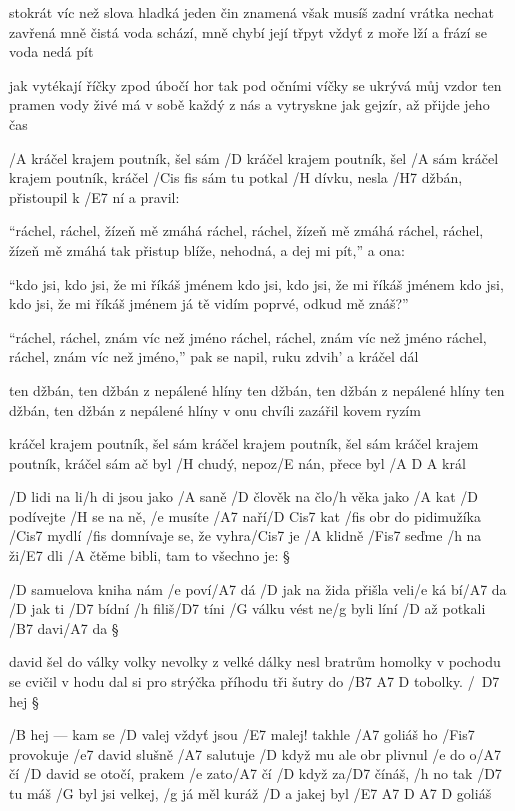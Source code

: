 stokrát víc než slova hladká jeden čin znamená
však musíš zadní vrátka nechat zavřená
mně čistá voda schází, mně chybí její třpyt
vždyť z moře lží a frází se voda nedá pít \s

jak vytékají říčky zpod úbočí hor
tak pod očními víčky se ukrývá můj vzdor
ten pramen vody živé má v sobě každý z nás
a vytryskne jak gejzír, až přijde jeho čas




/A kráčel krajem poutník, šel sám
/D kráčel krajem poutník, šel /A sám
kráčel krajem poutník, kráčel /{Cis fis} sám
tu potkal /H dívku, nesla /H7 džbán, přistoupil k /E7 ní a pravil: \s

``ráchel, ráchel, žízeň mě zmáhá
ráchel, ráchel, žízeň mě zmáhá
ráchel, ráchel, žízeň mě zmáhá
tak přistup blíže, nehodná, a dej mi pít,'' a ona: \s

``kdo jsi, kdo jsi, že mi říkáš jménem
kdo jsi, kdo jsi, že mi říkáš jménem
kdo jsi, kdo jsi, že mi říkáš jménem
já tě vidím poprvé, odkud mě znáš?'' \s

``ráchel, ráchel, znám víc než jméno
ráchel, ráchel, znám víc než jméno
ráchel, ráchel, znám víc než jméno,''
pak se napil, ruku zdvih' a kráčel dál \s

ten džbán, ten džbán z nepálené hlíny
ten džbán, ten džbán z nepálené hlíny
ten džbán, ten džbán z nepálené hlíny
v onu chvíli zazářil kovem ryzím \s

kráčel krajem poutník, šel sám
kráčel krajem poutník, šel sám
kráčel krajem poutník, kráčel sám
ač byl /H chudý, nepoz/E nán, přece byl /{A D A} král




/D lidi na li/h di jsou jako /A saně
/D člověk na člo/h věka jako /A kat
/D podívejte /H se na ně, /e musíte /A7 naří/{D Cis7} kat
/fis obr do pidimužíka /Cis7 mydlí
/fis domnívaje se, že vyhra/Cis7 je
/A klidně /Fis7 seďme /h na ži/E7 dli
/A čtěme bibli, tam to všechno je: \S

/D samuelova kniha nám /e poví/A7 dá
/D jak na žida přišla veli/e ká bí/A7 da
/D jak ti /D7 bídní /h filiš/D7 tíni %
/G válku vést ne/g byli líní
/D až potkali /B7 davi/A7 da \S

david šel do války volky nevolky
z velké dálky nesl bratrům homolky
v pochodu se cvičil v hodu %
dal si pro strýčka příhodu
tři šutry do /{B7 A7 D} tobolky. /\ D7 hej \S

/B hej --- kam se /D valej vždyť jsou /E7 malej!
takhle /A7 goliáš ho /Fis7 provokuje
/e7 david slušně /A7 salutuje
/D když mu ale obr plivnul /e do o/A7 čí
/D david se otočí, prakem /e zato/A7 čí
/D když za/D7 čínáš, /h no tak /D7 tu máš
/G byl jsi velkej, /g já měl kuráž %
/D a jakej byl /{E7 A7 D A7 D} goliáš



